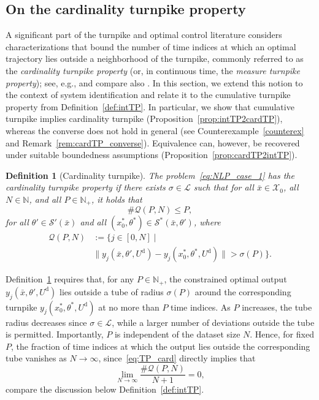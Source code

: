 \documentclass[a4paper,fleqn]{cas-dc}
\newtheorem{defn}{Definition}
\begin{document}
\subsection{On the cardinality turnpike property}\label{sec:cardTP}

A significant part of the turnpike and optimal control literature considers characterizations that bound the number of time indices at which an optimal trajectory lies outside a neighborhood of the turnpike, commonly referred to as the \emph{cardinality turnpike property} (or, in continuous time, the \emph{measure turnpike property}); see, e.g., \cite{Faulwasser2022} and compare also \cite{Gruene2018,Zaslavski2006,Gruene2016a,Trelat2018a}.
In this section, we extend this notion to the context of system identification and relate it to the cumulative turnpike property from Definition~\ref{def:intTP}. In particular, we show that cumulative turnpike implies cardinality turnpike (Proposition~\ref{prop:intTP2cardTP}), whereas the converse does not hold in general (see Counterexample~\ref{counterex} and Remark~\ref{rem:cardTP_converse}).
Equivalence can, however, be recovered under suitable boundedness assumptions (Proposition~\ref{prop:cardTP2intTP}).

\begin{defn}[Cardinality turnpike]\label{def:cardTP}
	The problem~\eqref{eq:NLP_case_1} has the \emph{cardinality turnpike property} if there exists $\sigma\in\mathcal{L}$ such that for all $\bar{x}\in\mathcal{X}_0$, all $N\in\mathbb{N}$, and all $P\in\mathbb{N}_+$, it holds that%
	\begin{equation}\label{eq:TP_card}
		\#\mathcal{Q}(P,N)\leq P,
	\end{equation}
	for all $\theta'\in\mathcal{S}'(\bar{x})$ and all $(x_0^*,\theta^*)\in\mathcal{S}^*(\bar{x},\theta')$, where
	\begin{equation}\label{eq:TP_card_Q}
		\begin{split}
		\mathcal{Q}(P,N)&:=\big\{j\in[0,N] \mid \\
		& \|y_j(\bar{x},\theta',U^\mathrm{d})-y_j(x_0^*,\theta^*,U^\mathrm{d})\|>\sigma(P)\big\}.
		\end{split}
	\end{equation}
\end{defn}

Definition~\ref{def:cardTP} requires that, for any $P\in\mathbb{N}_+$, the constrained optimal output $y_j(\bar{x},\theta',U^\mathrm{d})$ lies outside a tube of radius $\sigma(P)$ around the corresponding turnpike $y_j({x}_0^*,\theta^*,U^\mathrm{d})$ at no more than $P$ time indices.
As $P$ increases, the tube radius decreases since $\sigma\in\mathcal{L}$, while a larger number of deviations outside the tube is permitted. Importantly, $P$ is independent of the dataset size $N$. Hence, for fixed $P$, the fraction of time indices at which the output lies outside the corresponding tube vanishes as $N\to\infty$, since~\eqref{eq:TP_card} directly implies that
\begin{equation}
	\lim_{N \to \infty}\frac{\#\mathcal{Q}(P,N)}{N+1} = 0,
\end{equation}
compare the discussion below Definition~\ref{def:intTP}.
\end{document}
